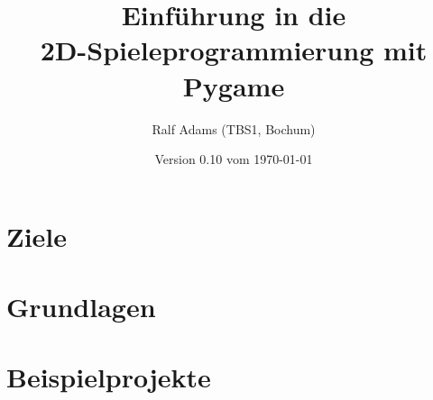 \documentclass[a4paper,12pt,twoside]{scrreprt}
\begin{document}
  \title{Einführung in die\\2D-Spieleprogrammierung mit Pygame}
  \author{Ralf Adams (TBS1, Bochum)}
  \date{Version 0.10 vom \today}
  \maketitle
  \tableofcontents

\setlength{\parindent}{0.0em}
\setlength{\parskip}{1.0ex plus0.5ex minus0.5ex}
\setlength{\itemsep}{-0.3ex plus0.2ex}


\chapter{Ziele}
\chapter{Grundlagen}\label{secGrundlagen}















\chapter{Beispielprojekte}



\listoffigures

\printglossaries
\printindex
{}
\end{document}
